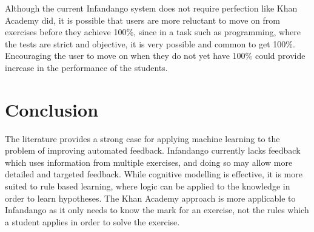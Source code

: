 Although the current Infandango system does not require perfection like Khan Academy did, it is possible that users are more reluctant to move on from exercises before they achieve 100\%, since in a task such as programming, where the tests are strict and objective, it is very possible and common to get 100\%. Encouraging the user to move on when they do not yet have 100\% could provide increase in the performance of the students.


\section{Conclusion}
The literature provides a strong case for applying machine learning to the problem of improving automated feedback. Infandango currently lacks feedback which uses information from multiple exercises, and doing so may allow more detailed and targeted feedback. While cognitive modelling is effective, it is more suited to rule based learning, where logic can be applied to the knowledge in order to learn hypotheses. The Khan Academy approach is more applicable to Infandango as it only needs to know the mark for an exercise, not the rules which a student applies in order to solve the exercise.
